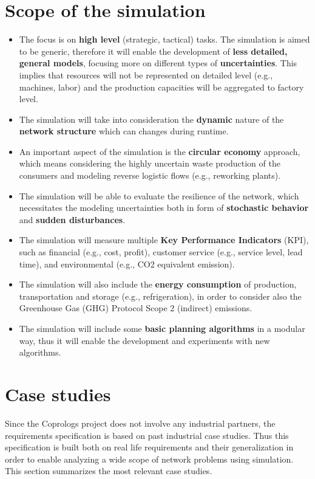 \documentclass{article}
\begin{document}
\newpage
\tableofcontents
\newpage

\section{Scope of the simulation}

\begin{itemize}
\item The focus is on \textbf{high level} (strategic, tactical) tasks. The simulation is aimed to be generic, therefore it will enable the development of \textbf{less detailed, general models}, focusing more on different types of \textbf{uncertainties}. This implies that resources will not be represented on detailed level (e.g., machines, labor) and the production capacities will be aggregated to factory level.
\item The simulation will take into consideration the \textbf{dynamic} nature of the \textbf{network structure} which can changes during runtime.
\item An important aspect of the simulation is the \textbf{circular economy} approach, which means considering the highly uncertain waste production of the consumers and modeling reverse logistic flows (e.g., reworking plants).
\item The simulation will be able to evaluate the resilience of the network, which necessitates the modeling uncertainties both in form of \textbf{stochastic behavior} and \textbf{sudden disturbances}.
\item The simulation will measure multiple \textbf{Key Performance Indicators} (KPI), such as financial (e.g., cost, profit), customer service (e.g., service level, lead time), and environmental (e.g., CO2 equivalent emission).
\item The simulation will also include the \textbf{energy consumption} of production, transportation and storage (e.g., refrigeration), in order to consider also the Greenhouse Gas (GHG) Protocol Scope 2 (indirect) emissions.
\item The simulation will include some \textbf{basic planning algorithms} in a modular way, thus it will enable the development and experiments with new algorithms.
\end{itemize}


\section{Case studies}

Since the Coprologs project does not involve any industrial partners, the requirements specification is based on past industrial case studies. Thus this specification is built both on real life requirements and their generalization in order to enable analyzing a wide scope of network problems using simulation. This section summarizes the most relevant case studies.
\end{document}
